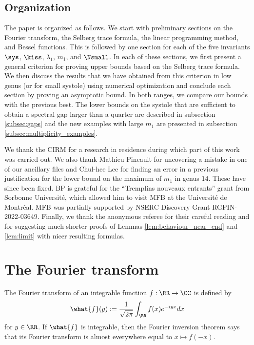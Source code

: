 \documentclass[12pt]{amsart}
\numberwithin{equation}{section}
\begin{document}
\subsection*{Organization}

The paper is organized as follows. We start with preliminary sections on the Fourier transform, the Selberg trace formula, the linear programming method, and Bessel functions. This is followed by one section for each of the five invariants $\sys$, $\kiss$, $\lambda_1$, $m_1$, and $\Nsmall$. In each of these sections, we first present a general criterion for proving  upper bounds based on the Selberg trace formula. We then discuss the results that we have obtained from this criterion in low genus (or for small systole) using numerical optimization and conclude each section by proving an asymptotic bound. In both ranges, we compare our bounds with the previous best. The lower bounds on the systole that are sufficient to obtain a spectral gap larger than a quarter are described in subsection \ref{subsec:gaps} and the new examples with large $m_1$ are presented in subsection \ref{subsec:multiplicity_examples}.

\begin{acknowledgements}
We thank the CIRM for a research in residence during which part of this work was carried out. We also thank Mathieu Pineault for uncovering a mistake in one of our ancillary files and Chul-hee Lee for finding an error in a previous justification for the lower bound on the maximum of $m_1$ in genus $14$. These have since been fixed. BP is grateful for the ``Tremplins nouveaux entrants'' grant from Sorbonne Universit\'e, which allowed him to visit MFB at the Universit\'e de Montr\'eal.  MFB was partially supported by NSERC Discovery Grant RGPIN-2022-03649. Finally, we thank the anonymous referee for their careful reading and for suggesting much shorter proofs of Lemmas \ref{lem:behaviour_near_end} and \ref{lem:limit} with nicer resulting formulas.
\end{acknowledgements}

\section{The Fourier transform}

The Fourier transform of an integrable function $f:\RR \to \CC$ is defined by
\[
\what{f}(y) := \frac{1}{\sqrt{2\pi}}\int_\RR f(x)e^{-i y x} dx
\]
for $y\in \RR$. If $\what{f}$ is integrable, then the Fourier inversion theorem says that its Fourier transform is almost everywhere equal to $x \mapsto f(-x)$.
\end{document}
